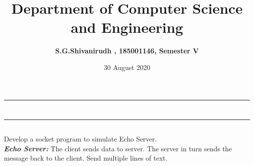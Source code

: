 \documentclass[12pt,letterpaper]{article}
\title{\textbf{Department of Computer Science and Engineering}}
\author{\textbf{S.G.Shivanirudh , 185001146, Semester V }}
\date{30 August 2020}
\begin{document}
\maketitle
\hrule
\section*{}
\hrule 
\bigskip\bigskip

\subsection*{}

\subsection*{}
\begin{flushleft}
Develop a socket program to simulate Echo Server.\\
\emph{\textbf{Echo Server:}} The client sends data to server. The server in turn sends the message back to the client.
Send multiple lines of text.
\end{flushleft}

\subsection*{}
\subsubsection*{}
\begin{flushleft}

\end{flushleft}
\newpage
\subsubsection*{}
\begin{flushleft}

\end{flushleft}

\subsection*{}
\subsubsection*{}
\begin{flushleft}

\end{flushleft}
\subsubsection*{}
\begin{flushleft}

\end{flushleft}
\end{document}
